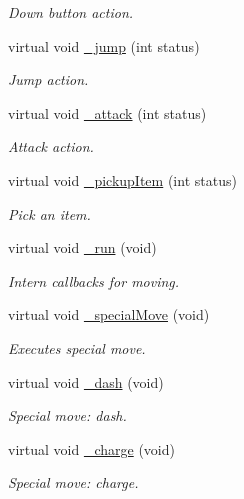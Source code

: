 \begin{DoxyCompactItemize}
\begin{DoxyCompactList}\small\item\em Down button action. \end{DoxyCompactList}\item 
virtual void \hyperlink{class_characters_afad45a33b0277605c50b90031371e00a}{\+\_\+jump} (int status)
\begin{DoxyCompactList}\small\item\em Jump action. \end{DoxyCompactList}\item 
virtual void \hyperlink{class_characters_a9ff6c76cd02e53019e15801e9c76a719}{\+\_\+attack} (int status)
\begin{DoxyCompactList}\small\item\em Attack action. \end{DoxyCompactList}\item 
virtual void \hyperlink{class_characters_aee824830a67177342ae606f959fb0c7a}{\+\_\+pickup\+Item} (int status)
\begin{DoxyCompactList}\small\item\em Pick an item. \end{DoxyCompactList}\item 
virtual void \hyperlink{class_characters_aa59e298bef3e58fc7c82deb86e762200}{\+\_\+run} (void)
\begin{DoxyCompactList}\small\item\em Intern callbacks for moving. \end{DoxyCompactList}\item 
virtual void \hyperlink{class_characters_a4720d3fc5500d8961a7c31bd5ff8bd46}{\+\_\+special\+Move} (void)
\begin{DoxyCompactList}\small\item\em Executes special move. \end{DoxyCompactList}\item 
virtual void \hyperlink{class_characters_ae257e3ffe539012f0269dfac0dec7235}{\+\_\+dash} (void)
\begin{DoxyCompactList}\small\item\em Special move\+: dash. \end{DoxyCompactList}\item 
virtual void \hyperlink{class_characters_a83da19abcd4c191ad6d23c11ad644bf3}{\+\_\+charge} (void)
\begin{DoxyCompactList}\small\item\em Special move\+: charge. \end{DoxyCompactList}\item 

\end{DoxyCompactItemize}
